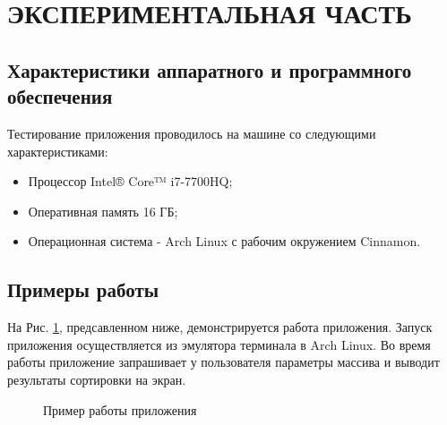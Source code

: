 \documentclass[a4paper,12pt]{article}
\begin{document}
\newpage
\section{ЭКСПЕРИМЕНТАЛЬНАЯ ЧАСТЬ}
\subsection{Характеристики аппаратного и программного обеспечения}
Тестирование приложения проводилось на машине со следующими характеристиками:\\
\begin{itemize}
\item Процессор Intel® Core™ i7-7700HQ;
\item Оперативная память 16 ГБ;
\item Операционная система - Arch Linux с рабочим окружением Cinnamon.
\end{itemize}

\newpage
\subsection{Примеры работы}
На Рис. \ref{images:example}, предсавленном ниже, демонстрируется работа приложения. Запуск приложения осуществляется из эмулятора терминала в Arch Linux. Во время работы приложение запрашивает у пользователя параметры массива и выводит результаты сортировки на экран.
\begin{figure}[h]
\caption{Пример работы приложения}
\label{images:example}
\end{figure}

\newpage
\end{document}
